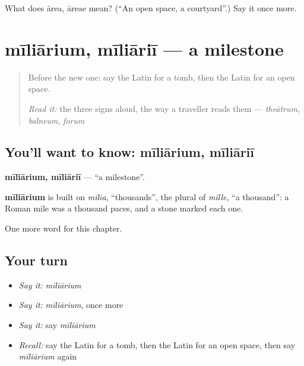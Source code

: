 \begin{tcolorbox}[breakable,colback=teal!4,colframe=teal!35!black,title={Before you move on}]
What does ārea, āreae mean? (\textquotedblleft{}An open space, a courtyard\textquotedblright{}.) Say it once more.
\end{tcolorbox}
\section[mīliārium, mīliāriī]{mīliārium, mīliāriī — a milestone}

\label{lesson:LA-C119-miliarium}



\begin{quote}
Before the new one: say the Latin for a tomb, then the Latin for an open space.

\emph{Read it:} the three signs aloud, the way a traveller reads them — \emph{theātrum}, \emph{balneum}, \emph{forum}
\end{quote}

\subsection*{You'll want to know: mīliārium, mīliāriī}
\textbf{mīliārium, mīliāriī} — \textquotedblleft{}a milestone\textquotedblright{}.

\begin{cousinweb}
\textbf{mīliārium} is built on \emph{mīlia}, \textquotedblleft{}thousands\textquotedblright{}, the plural of \emph{mīlle}, \textquotedblleft{}a thousand\textquotedblright{}: a Roman mile was a thousand paces, and a stone marked each one.
\end{cousinweb}

\begin{grammarlens}[title={What you've built}]
One more word for this chapter.
\end{grammarlens}

\subsection*{Your turn}
\begin{itemize}
\raggedright
  \item \emph{Say it:} \emph{mīliārium}
  \item \emph{Say it:} \emph{mīliārium}, once more
  \item \emph{Say it:} say \emph{mīliārium}
  \item \emph{Recall:} say the Latin for a tomb, then the Latin for an open space, then say \emph{mīliārium} again
\end{itemize}


